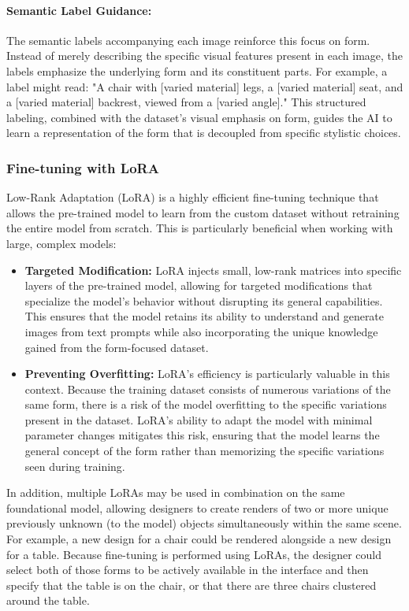 \documentclass{article}
\begin{document}
\paragraph{Semantic Label Guidance:} The semantic labels accompanying each image reinforce this focus on form. Instead of merely describing the specific visual features present in each image, the labels emphasize the underlying form and its constituent parts. For example, a label might read: "A chair with [varied material] legs, a [varied material] seat, and a [varied material] backrest, viewed from a [varied angle]." This structured labeling, combined with the dataset's visual emphasis on form, guides the AI to learn a representation of the form that is decoupled from specific stylistic choices.

\subsubsection{Fine-tuning with LoRA}
Low-Rank Adaptation (LoRA) is a highly efficient fine-tuning technique that allows the pre-trained model to learn from the custom dataset without retraining the entire model from scratch. This is particularly beneficial when working with large, complex models:

\begin{itemize}
    \item \textbf{Targeted Modification:} LoRA injects small, low-rank matrices into specific layers of the pre-trained model, allowing for targeted modifications that specialize the model's behavior without disrupting its general capabilities. This ensures that the model retains its ability to understand and generate images from text prompts while also incorporating the unique knowledge gained from the form-focused dataset.
    \item \textbf{Preventing Overfitting:} LoRA's efficiency is particularly valuable in this context. Because the training dataset consists of numerous variations of the same form, there is a risk of the model overfitting to the specific variations present in the dataset. LoRA's ability to adapt the model with minimal parameter changes mitigates this risk, ensuring that the model learns the general concept of the form rather than memorizing the specific variations seen during training.
\end{itemize}

In addition, multiple LoRAs may be used in combination on the same foundational model, allowing designers to create renders of two or more unique previously unknown (to the model) objects simultaneously within the same scene. For example, a new design for a chair could be rendered alongside a new design for a table. Because fine-tuning is performed using LoRAs, the designer could select both of those forms to be actively available in the interface and then specify that the table is on the chair, or that there are three chairs clustered around the table. 
\end{document}
